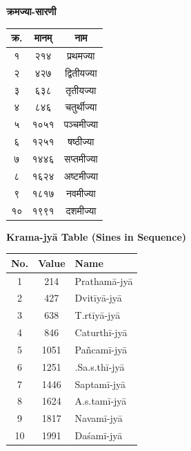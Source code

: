 \documentclass[11pt,a4paper]{book}
\newcommand{\dev}[1]{{\devanagarifont #1}}
\newcommand{\bilingual}[2]{%
  \par\vspace{0.6em}%
  \noindent\begin{minipage}[t]{0.48\textwidth}
    \RaggedRight
    #1%
  \end{minipage}%
  \hfill
  \begin{minipage}[t]{0.48\textwidth}
    \RaggedRight
    #2%
  \end{minipage}%
  \par\vspace{0.6em}%
}
\begin{document}
\vspace{0.5em}

\bilingual{%
\textbf{\dev{क्रमज्या-सारणी}}\\[0.2em]
\begin{tabular}{|c|c|c|}
\hline
क्र. & मानम्‌ & नाम \\
\hline
१ & २१४ & प्रथमज्या \\
२ & ४२७ & द्वितीयज्या \\
३ & ६३८ & तृतीयज्या \\
४ & ८४६ & चतुर्थीज्या \\
५ & १०५१ & पञ्चमीज्या \\
६ & १२५१ & षष्ठीज्या \\
७ & १४४६ & सप्तमीज्या \\
८ & १६२४ & अष्टमीज्या \\
९ & १८१७ & नवमीज्या \\
१० & १९९१ & दशमीज्या \\
\hline
\end{tabular}
}{%
\textbf{Krama-jyā Table (Sines in Sequence)}\\[0.2em]
\begin{tabular}{|c|c|l|}
\hline
No. & Value & Name \\
\hline
1 & 214 & Prathamā-jyā \\
2 & 427 & Dvitīyā-jyā \\
3 & 638 & T.rtīyā-jyā \\
4 & 846 & Caturthī-jyā \\
5 & 1051 & Pañcamī-jyā \\
6 & 1251 & .Sa.s.thī-jyā \\
7 & 1446 & Saptamī-jyā \\
8 & 1624 & A.s.tamī-jyā \\
9 & 1817 & Navamī-jyā \\
10 & 1991 & Daśamī-jyā \\
\hline
\end{tabular}
}
\end{document}
